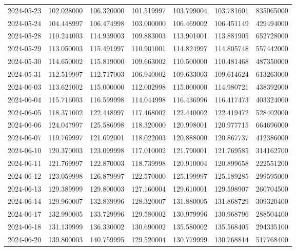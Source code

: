 \begin{tabular}{lrrrrrr}
2024-05-23 &  102.028000 &  106.320000 &  101.519997 &  103.799004 &  103.781601 &   835065000 \\
2024-05-24 &  104.448997 &  106.474998 &  103.000000 &  106.469002 &  106.451149 &   429494000 \\
2024-05-28 &  110.244003 &  114.939003 &  109.883003 &  113.901001 &  113.881905 &   652728000 \\
2024-05-29 &  113.050003 &  115.491997 &  110.901001 &  114.824997 &  114.805748 &   557442000 \\
2024-05-30 &  114.650002 &  115.819000 &  109.663002 &  110.500000 &  110.481468 &   487350000 \\
2024-05-31 &  112.519997 &  112.717003 &  106.940002 &  109.633003 &  109.614624 &   613263000 \\
2024-06-03 &  113.621002 &  115.000000 &  112.002998 &  115.000000 &  114.980721 &   438392000 \\
2024-06-04 &  115.716003 &  116.599998 &  114.044998 &  116.436996 &  116.417473 &   403324000 \\
2024-06-05 &  118.371002 &  122.448997 &  117.468002 &  122.440002 &  122.419472 &   528402000 \\
2024-06-06 &  124.047997 &  125.586998 &  118.320000 &  120.998001 &  120.977715 &   664696000 \\
2024-06-07 &  119.769997 &  121.692001 &  118.022003 &  120.888000 &  120.867737 &   412386000 \\
2024-06-10 &  120.370003 &  123.099998 &  117.010002 &  121.790001 &  121.769585 &   314162700 \\
2024-06-11 &  121.769997 &  122.870003 &  118.739998 &  120.910004 &  120.899658 &   222551200 \\
2024-06-12 &  123.059998 &  126.879997 &  122.570000 &  125.199997 &  125.189285 &   299595000 \\
2024-06-13 &  129.389999 &  129.800003 &  127.160004 &  129.610001 &  129.598907 &   260704500 \\
2024-06-14 &  129.960007 &  132.839996 &  128.320007 &  131.880005 &  131.868729 &   309320400 \\
2024-06-17 &  132.990005 &  133.729996 &  129.580002 &  130.979996 &  130.968796 &   288504400 \\
2024-06-18 &  131.139999 &  136.330002 &  130.690002 &  135.580002 &  135.568405 &   294335100 \\
2024-06-20 &  139.800003 &  140.759995 &  129.520004 &  130.779999 &  130.768814 &   517768400 \\

\end{tabular}
